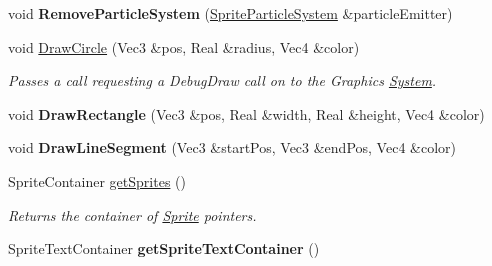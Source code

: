 \begin{DoxyCompactItemize}
\item 
\hypertarget{classDCEngine_1_1Components_1_1GraphicsSpace_ad4625ff6b0753dd968059f5cf85be332}{void {\bfseries Remove\-Particle\-System} (\hyperlink{classDCEngine_1_1Components_1_1SpriteParticleSystem}{Sprite\-Particle\-System} \&particle\-Emitter)}\label{classDCEngine_1_1Components_1_1GraphicsSpace_ad4625ff6b0753dd968059f5cf85be332}

\item 
\hypertarget{classDCEngine_1_1Components_1_1GraphicsSpace_ad4c45ab72c90dc9c58244a827087ac87}{void \hyperlink{classDCEngine_1_1Components_1_1GraphicsSpace_ad4c45ab72c90dc9c58244a827087ac87}{Draw\-Circle} (Vec3 \&pos, Real \&radius, Vec4 \&color)}\label{classDCEngine_1_1Components_1_1GraphicsSpace_ad4c45ab72c90dc9c58244a827087ac87}

\begin{DoxyCompactList}\small\item\em Passes a call requesting a Debug\-Draw call on to the Graphics \hyperlink{classDCEngine_1_1System}{System}. \end{DoxyCompactList}\item 
\hypertarget{classDCEngine_1_1Components_1_1GraphicsSpace_a47860f06cc2478dec4fc56d432b487a1}{void {\bfseries Draw\-Rectangle} (Vec3 \&pos, Real \&width, Real \&height, Vec4 \&color)}\label{classDCEngine_1_1Components_1_1GraphicsSpace_a47860f06cc2478dec4fc56d432b487a1}

\item 
\hypertarget{classDCEngine_1_1Components_1_1GraphicsSpace_a7df8df16b240039e7e2e53d5f23d0405}{void {\bfseries Draw\-Line\-Segment} (Vec3 \&start\-Pos, Vec3 \&end\-Pos, Vec4 \&color)}\label{classDCEngine_1_1Components_1_1GraphicsSpace_a7df8df16b240039e7e2e53d5f23d0405}

\item 
Sprite\-Container \hyperlink{classDCEngine_1_1Components_1_1GraphicsSpace_a062c59988ae8a5eabaee8fa937eb0829}{get\-Sprites} ()
\begin{DoxyCompactList}\small\item\em Returns the container of \hyperlink{classDCEngine_1_1Components_1_1Sprite}{Sprite} pointers. \end{DoxyCompactList}\item 
\hypertarget{classDCEngine_1_1Components_1_1GraphicsSpace_ab5e2b016c953de9c71c6f4bb37824ef4}{Sprite\-Text\-Container {\bfseries get\-Sprite\-Text\-Container} ()}\label{classDCEngine_1_1Components_1_1GraphicsSpace_ab5e2b016c953de9c71c6f4bb37824ef4}


\end{DoxyCompactItemize}
